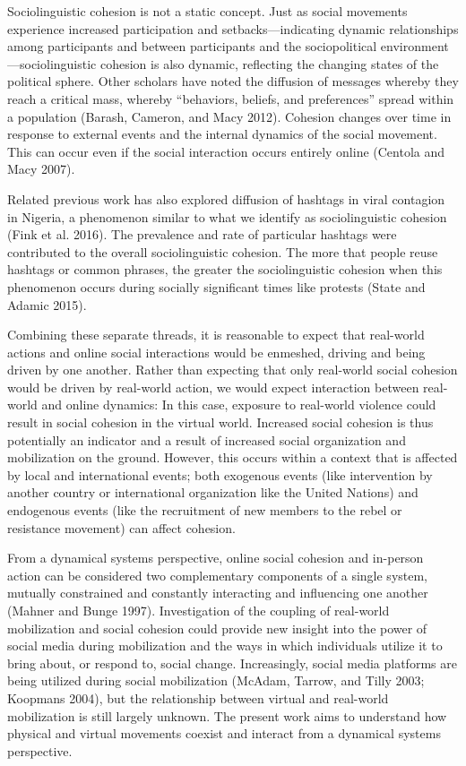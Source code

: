 \documentclass[
  english,
  man]{apa6}
\begin{document}
Sociolinguistic cohesion is not a static concept. Just as social movements
experience increased participation and setbacks---indicating dynamic
relationships among participants and between participants and the sociopolitical
environment---sociolinguistic cohesion is also dynamic, reflecting the changing
states of the political sphere. Other scholars have noted the diffusion of
messages whereby they reach a critical mass, whereby \enquote{behaviors, beliefs, and
preferences} spread within a population (Barash, Cameron, and Macy 2012). Cohesion
changes over time in response to external events and the internal dynamics of
the social movement. This can occur even if the social interaction occurs entirely
online (Centola and Macy 2007).

Related previous work has also explored diffusion of hashtags in viral contagion in
Nigeria, a phenomenon similar to what we identify as sociolinguistic cohesion
(Fink et al. 2016). The prevalence and rate of particular hashtags were
contributed to the overall sociolinguistic cohesion. The more that people
reuse hashtags or common phrases, the greater the sociolinguistic cohesion when
this phenomenon occurs during socially significant times like protests
(State and Adamic 2015).

Combining these separate threads, it is reasonable to expect that real-world
actions and online social interactions would be enmeshed, driving and being
driven by one another. Rather than expecting that only real-world social
cohesion would be driven by real-world action, we would expect interaction
between real-world and online dynamics: In this case, exposure to real-world
violence could result in social cohesion in the virtual world. Increased social
cohesion is thus potentially an indicator and a result of increased social
organization and mobilization on the ground. However, this occurs within a
context that is affected by local and international events; both exogenous
events (like intervention by another country or international organization like
the United Nations) and endogenous events (like the recruitment of new members
to the rebel or resistance movement) can affect cohesion.

From a dynamical systems perspective, online social cohesion and in-person
action can be considered two complementary components of a single system,
mutually constrained and constantly interacting and influencing one another
(Mahner and Bunge 1997). Investigation of the coupling of real-world
mobilization and social cohesion could provide new insight into the power of
social media during mobilization and the ways in which individuals utilize it to
bring about, or respond to, social change. Increasingly, social media platforms
are being utilized during social mobilization (McAdam, Tarrow, and Tilly 2003; Koopmans 2004), but the relationship between virtual and real-world
mobilization is still largely unknown. The present work aims to understand how
physical and virtual movements coexist and interact from a dynamical systems
perspective.
\end{document}

